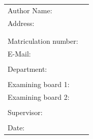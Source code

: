 \begin{titlepage}
	\sffamily

	\begin{figure}%
		\centering
		\qquad
	\end{figure}

	\vspace{2.5cm}

	\begin{center}
		\huge{\thesistitle}

		\vspace{3cm}

		\renewcommand{\baselinestretch}{1.3}
		\Large{\thesistype}

		\large
		\thesistypedesc
	\end{center}

	\vspace{1.5cm}
	\renewcommand{\baselinestretch}{1}
	\begin{table}[htpb]
		\centering
		\begin{tabular}{ll}
			\\
			Author Name: & \thesisauthorname \\
			Address: & \thesisauthorhomestreet \\
			& \thesisauthorhometown \\
			\\
			Matriculation number: & \thesisauthormatrikelnumber \\
			E-Mail: & \thesisauthoremail \\
			\\
			Department: & \thesisdepartment \\
			\\
			Examining board 1: & \thesisfirstreviewer \\
			Examining board 2: & \thesissecondreviewer \\
			\\
			Supervisor: & \thesissupervisor \\
			\\
			Date: & \thesisdate \\
		\end{tabular}
	\end{table}

	\rmfamily
\end{titlepage}
